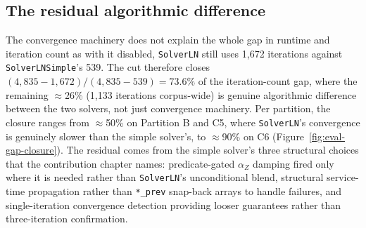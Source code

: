 \begin{table}[h]
\centering
\footnotesize
\setlength{\tabcolsep}{5pt}
\caption{The seven fixtures whose \texttt{SolverLN} output drifts by more than 5\% when the convergence control is disabled.}
\label{tab:eval-f20-accuracy-losses}
\end{table}

\subsection{The residual algorithmic difference}
\label{sec:eval-residual}

The convergence machinery does not explain the whole gap in runtime and iteration count as with it disabled, \texttt{SolverLN} still uses 1,672 iterations against \texttt{SolverLNSimple}'s 539. The cut therefore closes $(4{,}835-1{,}672)/(4{,}835-539) = 73.6\%$ of the iteration-count gap, where the remaining $\approx$26\% (1,133 iterations corpus-wide) is genuine algorithmic difference between the two solvers, not just convergence machinery. Per partition, the closure ranges from $\approx$50\% on Partition B and C5, where \texttt{SolverLN}'s convergence is genuinely slower than the simple solver's, to $\approx$90\% on C6 (Figure~\ref{fig:eval-gap-closure}). The residual comes from the simple solver's three structural choices that the contribution chapter names: predicate-gated $\alpha_Z$ damping fired only where it is needed rather than \texttt{SolverLN}'s unconditional blend, structural service-time propagation rather than \texttt{*\_prev} snap-back arrays to handle failures, and single-iteration convergence detection providing looser guarantees rather than three-iteration confirmation.

